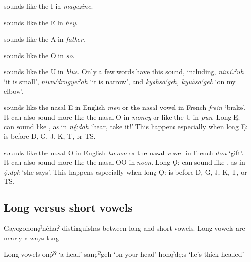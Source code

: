 \begin{description}[font=\normalfont]
\item[I] sounds like the I  in \textit{magazine}. 

\item[E] sounds like the E  in \textit{hey}.

\item[A] sounds like the A  in \textit{father}.

\item[O] sounds like the O  in \textit{so}.

\item[U] sounds like the U  in \textit{blue}. Only a few words have this sound, including, \textit{niwú:ˀuh} ‘it is small’, \textit{niwuˀdrugye:ˀah} ‘it is narrow’, and \textit{kyohsaˀgeh, kyuhsaˀgeh} ‘on my elbow’. 

\item[Ę] sounds like the nasal E  in English \textit{men} or the nasal vowel in French \textit{frein} ‘brake’. It can also sound more like the nasal O  in \textit{money} or like the U in \textit{pun}. Long Ę: can sound like , as in \textit{nę́:dah}  ‘hear, take it!’ This happens especially when long Ę: is before D, G, J, K, T, or TS.

\item[Ǫ] sounds like the nasal O  in English \textit{known} or the nasal vowel in French \textit{don} ‘gift’. It can also sound more like the nasal OO  in \textit{noon}. Long Ǫ: can sound like , as in \textit{ǫ́:dǫh}  ‘she says’. This happens especially when long Ǫ: is before D, G, J, K, T, or TS.

\end{description}


\subsection{Long versus short vowels}\label{longvsshortvowels}

Gayogo̱honǫˀnéha:ˀ distinguishes between long and short vowels. Long vowels are nearly always long. 

\ea\label{long.vowels} Long vowels
\ea onǫ́ˀˀ ‘a head’
\ex sanǫˀˀgeh ‘on your head’
\ex honǫˀdę:s ‘he’s thick-headed’
\z
\z 

